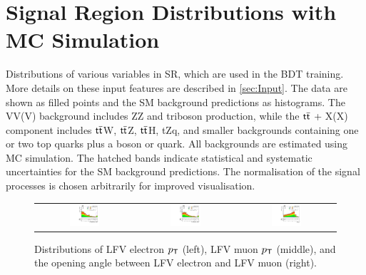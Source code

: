 \chapter{Signal Region Distributions with MC Simulation}
\label{chap:SRMC}

Distributions of various variables in \ac{SR}, which are used in the \ac{BDT} training. More details on these input features are described in \autoref{sec:Input}. The data are shown as filled points and the \ac{SM} background predictions as histograms. The VV(V) background includes ZZ and triboson production, while the $\textsf{t}\overline{\textsf{t}}$ + X(X) component includes $\textsf{t}\overline{\textsf{t}}$W, $\textsf{t}\overline{\textsf{t}}$Z, $\textsf{t}\overline{\textsf{t}}$H, tZq, and smaller backgrounds containing one or two top quarks plus a boson or quark. All backgrounds are estimated using \ac{MC} simulation. The hatched bands indicate statistical and systematic uncertainties for the \ac{SM} background predictions. The normalisation of the signal processes is chosen arbitrarily for improved visualisation. 

\begin{figure}[tbh!]
 \begin{center}
 \begin{tabular}{ccc}
    \includegraphics[width=0.325\textwidth]{figures/Appendix/SRMC/LFVePt}&
    \includegraphics[width=0.325\textwidth]{figures/Appendix/SRMC/LFVmuPt}&
    \includegraphics[width=0.325\textwidth]{figures/Appendix/SRMC/llDr}\\
 \end{tabular}
 \caption{Distributions of LFV electron $p_{\textsf{T}}$ (left), LFV muon $p_{\textsf{T}}$ (middle), and the opening angle between LFV electron and LFV muon (right).}
 \label{fig:input_vali_1}
 \end{center}
\end{figure}

